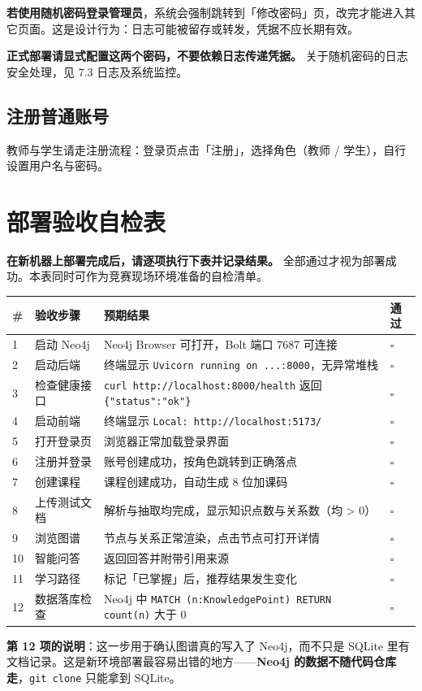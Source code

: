\documentclass[UTF8,a4paper,11pt]{ctexrep}
\begin{document}
\begin{notebox}
\textbf{若使用随机密码登录管理员}，系统会强制跳转到「修改密码」页，改完才能进入其它页面。这是设计行为：日志可能被留存或转发，凭据不应长期有效。

\textbf{正式部署请显式配置这两个密码，不要依赖日志传递凭据。} 关于随机密码的日志安全处理，见 7.3 日志及系统监控。

\end{notebox}


\subsection{注册普通账号}

教师与学生请走注册流程：登录页点击「注册」，选择角色（教师 / 学生），自行设置用户名与密码。


\section{部署验收自检表}

\textbf{在新机器上部署完成后，请逐项执行下表并记录结果。} 全部通过才视为部署成功。本表同时可作为竞赛现场环境准备的自检清单。

\begin{center}
\small
\begin{tabularx}{\linewidth}{@{}XXXX@{}}
\toprule
\# & 验收步骤 & 预期结果 & 通过 \\
\midrule
1 & 启动 Neo4j & Neo4j Browser 可打开，Bolt 端口 7687 可连接 & $\square$ \\
2 & 启动后端 & 终端显示 \texttt{Uvicorn running on ...:8000}，无异常堆栈 & $\square$ \\
3 & 检查健康接口 & \texttt{curl http://localhost:8000/health} 返回 \texttt{\{"status":"ok"\}} & $\square$ \\
4 & 启动前端 & 终端显示 \texttt{Local: http://localhost:5173/} & $\square$ \\
5 & 打开登录页 & 浏览器正常加载登录界面 & $\square$ \\
6 & 注册并登录 & 账号创建成功，按角色跳转到正确落点 & $\square$ \\
7 & 创建课程 & 课程创建成功，自动生成 8 位加课码 & $\square$ \\
8 & 上传测试文档 & 解析与抽取均完成，显示知识点数与关系数（均 > 0） & $\square$ \\
9 & 浏览图谱 & 节点与关系正常渲染，点击节点可打开详情 & $\square$ \\
10 & 智能问答 & 返回回答并附带引用来源 & $\square$ \\
11 & 学习路径 & 标记「已掌握」后，推荐结果发生变化 & $\square$ \\
12 & 数据落库检查 & Neo4j 中 \texttt{MATCH (n:KnowledgePoint) RETURN count(n)} 大于 0 & $\square$ \\
\bottomrule
\end{tabularx}
\end{center}
\textbf{第 12 项的说明}：这一步用于确认图谱真的写入了 Neo4j，而不只是 SQLite 里有文档记录。这是新环境部署最容易出错的地方——\textbf{Neo4j 的数据不随代码仓库走}，\texttt{git clone} 只能拿到 SQLite。
\end{document}
